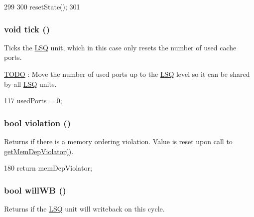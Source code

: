\begin{DoxyCode}
299 {
300     resetState();
301 }
\end{DoxyCode}
\hypertarget{classLSQUnit_a873dd91783f9efb4a590aded1f70d6b0}{
\subsubsection[{tick}]{\setlength{\rightskip}{0pt plus 5cm}void tick ()}}
\label{classLSQUnit_a873dd91783f9efb4a590aded1f70d6b0}
Ticks the \hyperlink{classLSQ}{LSQ} unit, which in this case only resets the number of used cache ports. \begin{Desc}
\item[\hyperlink{todo__todo000035}{TODO}]: Move the number of used ports up to the \hyperlink{classLSQ}{LSQ} level so it can be shared by all \hyperlink{classLSQ}{LSQ} units. \end{Desc}



\begin{DoxyCode}
117 { usedPorts = 0; }
\end{DoxyCode}
\hypertarget{classLSQUnit_a4f720bbfb5fdefdb23516500eeb0b4de}{
\subsubsection[{violation}]{\setlength{\rightskip}{0pt plus 5cm}bool violation ()}}
\label{classLSQUnit_a4f720bbfb5fdefdb23516500eeb0b4de}
Returns if there is a memory ordering violation. Value is reset upon call to \hyperlink{classLSQUnit_a30adaf6f5fb6b38b5747f35c419e3f31}{getMemDepViolator()}. 


\begin{DoxyCode}
180 { return memDepViolator; }
\end{DoxyCode}
\hypertarget{classLSQUnit_a338be821734603396bfef8d9fb8f04b0}{
\subsubsection[{willWB}]{\setlength{\rightskip}{0pt plus 5cm}bool willWB ()}}
\label{classLSQUnit_a338be821734603396bfef8d9fb8f04b0}
Returns if the \hyperlink{classLSQ}{LSQ} unit will writeback on this cycle. 


